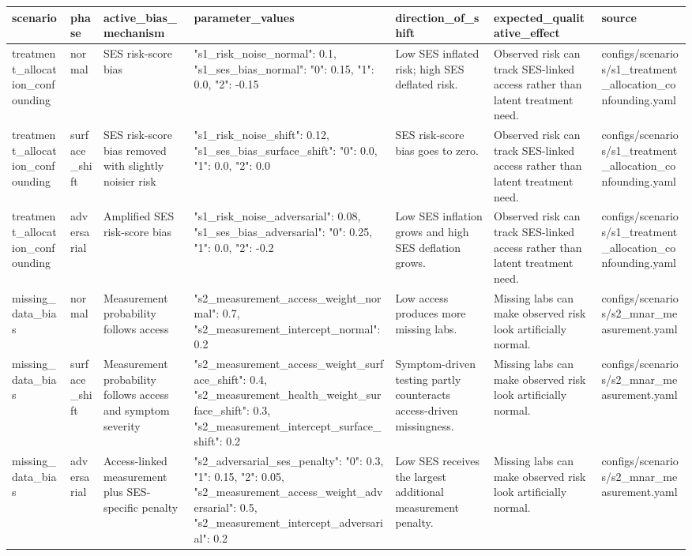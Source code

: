\begin{tabular}{lllllll}
\toprule
scenario & phase & active\_bias\_mechanism & parameter\_values & direction\_of\_shift & expected\_qualitative\_effect & source \\
\midrule
treatment\_allocation\_confounding & normal & SES risk-score bias & {"s1\_risk\_noise\_normal": 0.1, "s1\_ses\_bias\_normal": {"0": 0.15, "1": 0.0, "2": -0.15}} & Low SES inflated risk; high SES deflated risk. & Observed risk can track SES-linked access rather than latent treatment need. & configs/scenarios/s1\_treatment\_allocation\_confounding.yaml \\
treatment\_allocation\_confounding & surface\_shift & SES risk-score bias removed with slightly noisier risk & {"s1\_risk\_noise\_shift": 0.12, "s1\_ses\_bias\_surface\_shift": {"0": 0.0, "1": 0.0, "2": 0.0}} & SES risk-score bias goes to zero. & Observed risk can track SES-linked access rather than latent treatment need. & configs/scenarios/s1\_treatment\_allocation\_confounding.yaml \\
treatment\_allocation\_confounding & adversarial & Amplified SES risk-score bias & {"s1\_risk\_noise\_adversarial": 0.08, "s1\_ses\_bias\_adversarial": {"0": 0.25, "1": 0.0, "2": -0.2}} & Low SES inflation grows and high SES deflation grows. & Observed risk can track SES-linked access rather than latent treatment need. & configs/scenarios/s1\_treatment\_allocation\_confounding.yaml \\
missing\_data\_bias & normal & Measurement probability follows access & {"s2\_measurement\_access\_weight\_normal": 0.7, "s2\_measurement\_intercept\_normal": 0.2} & Low access produces more missing labs. & Missing labs can make observed risk look artificially normal. & configs/scenarios/s2\_mnar\_measurement.yaml \\
missing\_data\_bias & surface\_shift & Measurement probability follows access and symptom severity & {"s2\_measurement\_access\_weight\_surface\_shift": 0.4, "s2\_measurement\_health\_weight\_surface\_shift": 0.3, "s2\_measurement\_intercept\_surface\_shift": 0.2} & Symptom-driven testing partly counteracts access-driven missingness. & Missing labs can make observed risk look artificially normal. & configs/scenarios/s2\_mnar\_measurement.yaml \\
missing\_data\_bias & adversarial & Access-linked measurement plus SES-specific penalty & {"s2\_adversarial\_ses\_penalty": {"0": 0.3, "1": 0.15, "2": 0.05}, "s2\_measurement\_access\_weight\_adversarial": 0.5, "s2\_measurement\_intercept\_adversarial": 0.2} & Low SES receives the largest additional measurement penalty. & Missing labs can make observed risk look artificially normal. & configs/scenarios/s2\_mnar\_measurement.yaml \\

\end{tabular}

